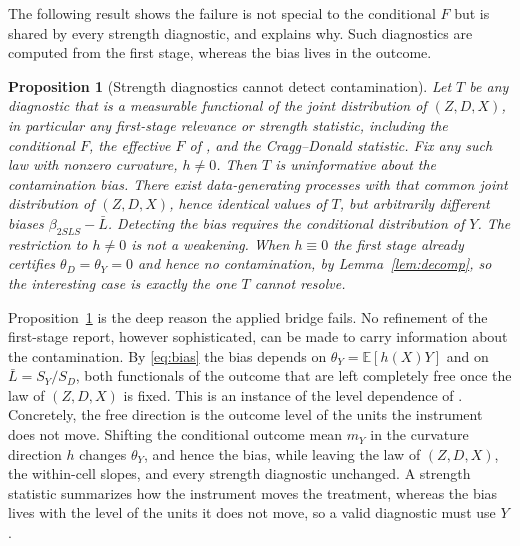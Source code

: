 \documentclass[preprint,11pt,authoryear]{elsarticle}
\newtheorem{proposition}{Proposition}
\theoremstyle{definition}
\newcommand{\E}{\mathbb{E}}
\begin{document}
The following result shows the failure is not special to the conditional $F$ but
is shared by every strength diagnostic, and explains why. Such diagnostics
are computed from the first stage, whereas the bias lives in the outcome.

\begin{proposition}[Strength diagnostics cannot detect contamination]
\label{prop:impossible}
Let $T$ be any diagnostic that is a measurable functional of the joint
distribution of $(Z,D,X)$, in particular any first-stage relevance or strength
statistic, including the conditional $F$, the effective $F$ of
\citet{montielolea2013}, and the Cragg--Donald statistic. Fix any such law with
nonzero curvature, $h\neq0$. Then $T$ is uninformative about the contamination
bias. There exist data-generating processes with that common joint distribution of
$(Z,D,X)$, hence identical values of $T$, but arbitrarily different biases
$\beta_{2SLS}-\bar L$. Detecting the bias requires the conditional distribution of
$Y$. The restriction to $h\neq0$ is not a weakening. When $h\equiv0$ the first stage
already certifies $\theta_D=\theta_Y=0$ and hence no contamination, by
Lemma~\ref{lem:decomp}, so the interesting case is exactly the one $T$ cannot
resolve.
\end{proposition}

Proposition~\ref{prop:impossible} is the deep reason the applied bridge fails. No
refinement of the first-stage report, however sophisticated, can be made to carry
information about the contamination. By \eqref{eq:bias} the bias depends on
$\theta_Y=\E[h(X)Y]$ and on $\bar L=S_Y/S_D$, both functionals of the outcome that
are left completely free once the law of $(Z,D,X)$ is fixed. This is an instance
of the level dependence of \citet{blandhol2022}. Concretely, the free
direction is the outcome level of the units the instrument does not move. Shifting the
conditional outcome mean $m_Y$ in the curvature direction $h$ changes $\theta_Y$, and
hence the bias, while leaving the law of $(Z,D,X)$, the within-cell slopes, and every
strength diagnostic unchanged. A strength statistic summarizes how the instrument moves
the treatment, whereas the bias lives with the level of the units it does not move, so a
valid diagnostic must use $Y$.
\end{document}
